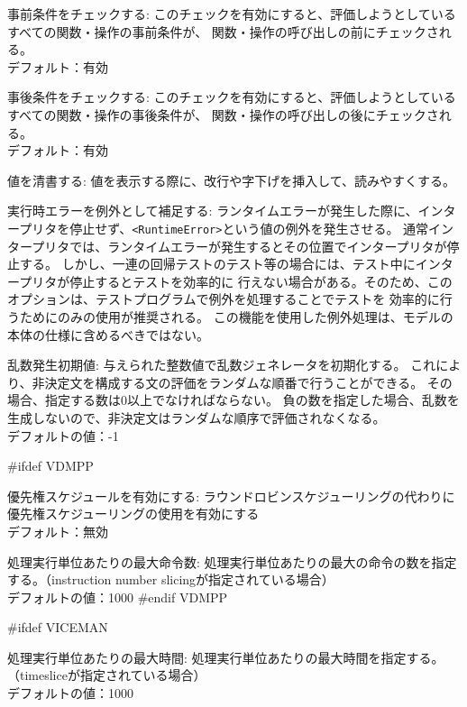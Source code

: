 \documentclass[\pformat,12pt]{article}
\newcommand{\guicmd}[1]{{\sf #1}}
\newcommand{\guicmd}[1]{{\gt #1}}
\begin{document}
\begin{list}{}{}
\item[{\guicmd{事前条件をチェックする}}:]
  このチェックを有効にすると、評価しようとしているすべての関数・操作の事前条件が、
  関数・操作の呼び出しの前にチェックされる。 \\
  デフォルト：有効
  
\item[{\guicmd{事後条件をチェックする}}:]
  このチェックを有効にすると、評価しようとしているすべての関数・操作の事後条件が、
  関数・操作の呼び出しの後にチェックされる。 \\
  デフォルト：有効
  
\item[{\guicmd{値を清書する}}:]
  値を表示する際に、改行や字下げを挿入して、読みやすくする。
  
\item[{\guicmd{実行時エラーを例外として補足する}}:]
  ランタイムエラーが発生した際に、インタープリタを停止せず、{\tt<RuntimeError>}という値の例外を発生させる。
  通常インタープリタでは、ランタイムエラーが発生するとその位置でインタープリタが停止する。
しかし、一連の回帰テストのテスト等の場合には、テスト中にインタープリタが停止するとテストを効率的に
行えない場合がある。そのため、このオプションは、テストプログラムで例外を処理することでテストを
効率的に行うためにのみの使用が推奨される。
この機能を使用した例外処理は、モデルの本体の仕様に含めるべきではない。

\item[{\guicmd{乱数発生初期値}}:]
与えられた整数値で乱数ジェネレータを初期化する。
これにより、非決定文を構成する文の評価をランダムな順番で行うことができる。
その場合、指定する数は0以上でなければならない。
負の数を指定した場合、乱数を生成しないので、非決定文はランダムな順序で評価されなくなる。 \\
デフォルトの値：-1

#ifdef VDMPP
\item[\guicmd{優先権スケジュールを有効にする}:]
  ラウンドロビンスケジューリングの代わりに優先権スケジューリングの使用を有効にする \\
  デフォルト：無効
  
\item[\guicmd{処理実行単位あたりの最大命令数}:]
  処理実行単位あたりの最大の命令の数を指定する。（instruction number slicingが指定されている場合） \\
  デフォルトの値：1000
#endif VDMPP

#ifdef VICEMAN
\item[\guicmd{処理実行単位あたりの最大時間}:]
  処理実行単位あたりの最大時間を指定する。（timesliceが指定されている場合） \\
  デフォルトの値：1000


\end{list}
\end{document}
